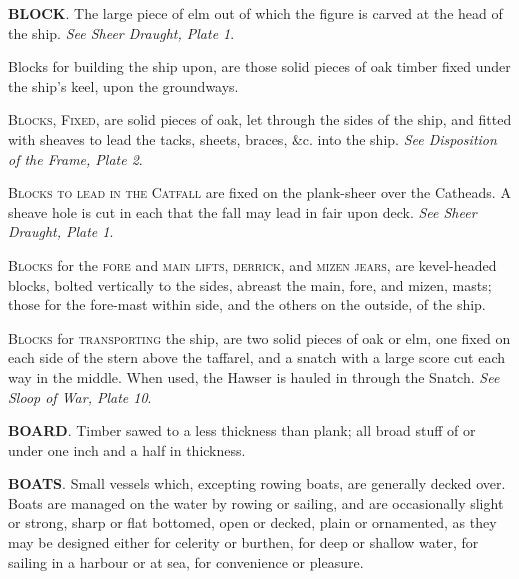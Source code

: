 \textbf{BLOCK}. The large piece of elm out of which the figure is carved at the head of the ship. \textit{See Sheer Draught, Plate 1}. 

Blocks for building the ship upon, are those solid pieces of oak timber fixed under the ship's keel, upon the groundways. 

\textsc{Blocks, Fixed}, are solid pieces of oak, let through the sides of the ship, and fitted with sheaves to lead the tacks, sheets, braces, \&c. into the ship. \textit{See Disposition of the Frame, Plate 2}. 

\textsc{Blocks to lead in the Catfall} are fixed on the plank-sheer over the Catheads. A sheave hole is cut in each that the fall may lead in fair upon deck. \textit{See Sheer Draught, Plate 1}. 

\textsc{Blocks} for the \textsc{fore} and \textsc{main lifts}, \textsc{derrick}, and \textsc{mizen jears}, are kevel-headed blocks, bolted vertically to the sides, abreast the main, fore, and mizen, masts; those for the fore-mast within side, and the others on the outside, of the ship. 

\textsc{Blocks} for \textsc{transporting} the ship, are two solid pieces of oak or elm, one fixed on each side of the stern above the taffarel, and a snatch with a large score cut each way in the middle. When used, the Hawser is hauled in through the Snatch. \textit{See Sloop of War, Plate 10}. 

\textbf{BOARD}. Timber sawed to a less thickness than plank; all broad stuff of or under one inch and a half in thickness. 

\textbf{BOATS}. Small vessels which, excepting rowing boats, are generally decked over. Boats are managed on the water by rowing or sailing, and are occasionally slight or strong, sharp or flat bottomed, open or decked, plain or ornamented, as they may be designed either for celerity or burthen, for deep or shallow water, for sailing in a harbour or at sea, for convenience or pleasure. 

